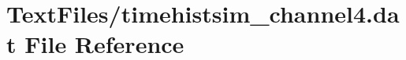 \hypertarget{TextFiles_2timehistsim__channel4_8dat}{}\section{Text\+Files/timehistsim\+\_\+channel4.dat File Reference}
\label{TextFiles_2timehistsim__channel4_8dat}
